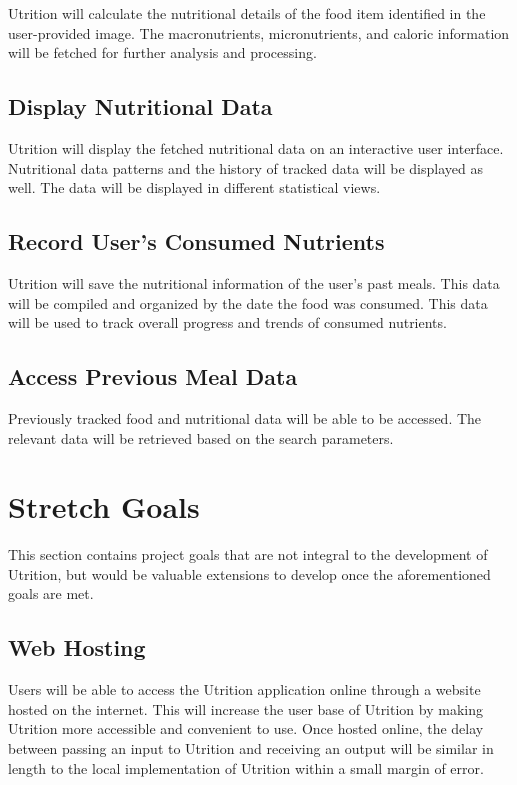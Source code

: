 \documentclass{article}
\begin{document}
Utrition will calculate the nutritional details of the food item identified in the user-provided image. The macronutrients, micronutrients, and caloric information will be fetched for further analysis and processing.

\subsection{Display Nutritional Data}

Utrition will display the fetched nutritional data on an interactive user 
interface. Nutritional data patterns and the history of tracked data will be 
displayed as well. The data will be displayed in different statistical views.

\subsection{Record User's Consumed Nutrients}

Utrition will save the nutritional information of the user's past meals. This 
data will be compiled and organized by the date the food was consumed. This 
data will be used to track overall progress and trends of consumed nutrients.

\subsection{Access Previous Meal Data}

Previously tracked food and nutritional data will be able to be accessed. The 
relevant data will be retrieved based on the search parameters.

\section{Stretch Goals}

This section contains project goals that are not integral to the development of Utrition, but would be valuable extensions to develop once the aforementioned goals are met.

\subsection{Web Hosting}

Users will be able to access the Utrition application online through a website hosted on the internet. This will increase the user base of Utrition by making Utrition more accessible and convenient to use. Once hosted online, the delay between passing an input to Utrition and receiving an output will be similar in length to the local implementation of Utrition within a small margin of error.
\end{document}
